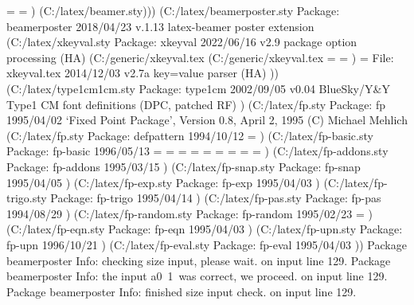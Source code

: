 \beamer@dima=
\beamer@dimb=
) (C:\Users\SEARS\AppData\Local\Programs\MiKTeX\tex/latex/beamer\beamerouterthemedefault.sty))) (C:\Users\SEARS\AppData\Local\Programs\MiKTeX\tex/latex/beamerposter\beamerposter.sty
Package: beamerposter 2018/04/23 v.1.13 latex-beamer poster extension
 (C:\Users\SEARS\AppData\Local\Programs\MiKTeX\tex/latex/xkeyval\xkeyval.sty
Package: xkeyval 2022/06/16 v2.9 package option processing (HA)
 (C:\Users\SEARS\AppData\Local\Programs\MiKTeX\tex/generic/xkeyval\xkeyval.tex (C:\Users\SEARS\AppData\Local\Programs\MiKTeX\tex/generic/xkeyval\xkvutils.tex
\XKV@toks=
\XKV@tempa@toks=
)
\XKV@depth=
File: xkeyval.tex 2014/12/03 v2.7a key=value parser (HA)
)) (C:\Users\SEARS\AppData\Local\Programs\MiKTeX\tex/latex/type1cm\type1cm.sty
Package: type1cm 2002/09/05 v0.04 BlueSky/Y&Y Type1 CM font definitions (DPC, patched RF)
) (C:\Users\SEARS\AppData\Local\Programs\MiKTeX\tex/latex/fp\fp.sty
Package: fp 1995/04/02
 `Fixed Point Package', Version 0.8, April 2, 1995 (C) Michael Mehlich (C:\Users\SEARS\AppData\Local\Programs\MiKTeX\tex/latex/fp.sty
Package: defpattern 1994/10/12
\actioncount=
) (C:\Users\SEARS\AppData\Local\Programs\MiKTeX\tex/latex/fp\fp-basic.sty
Package: fp-basic 1996/05/13
\FP@xs=
\FP@xia=
\FP@xib=
\FP@xfa=
\FP@xfb=
\FP@rega=
\FP@regb=
\FP@regs=
\FP@times=
) (C:\Users\SEARS\AppData\Local\Programs\MiKTeX\tex/latex/fp\fp-addons.sty
Package: fp-addons 1995/03/15
) (C:\Users\SEARS\AppData\Local\Programs\MiKTeX\tex/latex/fp\fp-snap.sty
Package: fp-snap 1995/04/05
) (C:\Users\SEARS\AppData\Local\Programs\MiKTeX\tex/latex/fp\fp-exp.sty
Package: fp-exp 1995/04/03
) (C:\Users\SEARS\AppData\Local\Programs\MiKTeX\tex/latex/fp\fp-trigo.sty
Package: fp-trigo 1995/04/14
) (C:\Users\SEARS\AppData\Local\Programs\MiKTeX\tex/latex/fp\fp-pas.sty
Package: fp-pas 1994/08/29
) (C:\Users\SEARS\AppData\Local\Programs\MiKTeX\tex/latex/fp\fp-random.sty
Package: fp-random 1995/02/23
\FPseed=
) (C:\Users\SEARS\AppData\Local\Programs\MiKTeX\tex/latex/fp\fp-eqn.sty
Package: fp-eqn 1995/04/03
) (C:\Users\SEARS\AppData\Local\Programs\MiKTeX\tex/latex/fp\fp-upn.sty
Package: fp-upn 1996/10/21
) (C:\Users\SEARS\AppData\Local\Programs\MiKTeX\tex/latex/fp\fp-eval.sty
Package: fp-eval 1995/04/03
))
Package beamerposter Info: checking size input, please wait. on input line 129.
Package beamerposter Info: the input a0\ 1\ was correct, we proceed. on input line 129.
Package beamerposter Info: finished size input check. on input line 129.
